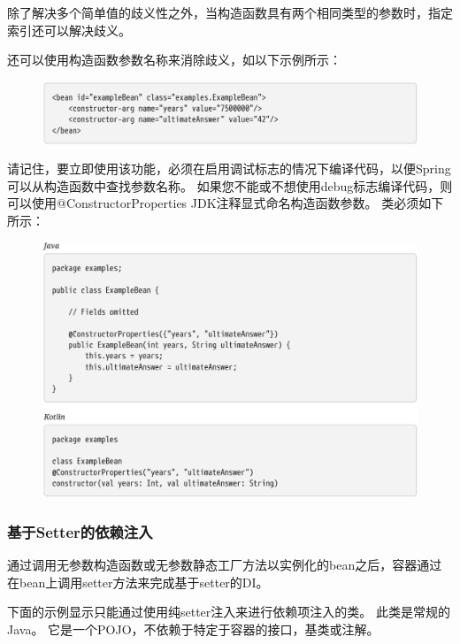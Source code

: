除了解决多个简单值的歧义性之外，当构造函数具有两个相同类型的参数时，指定索引还可以解决歧义。

还可以使用构造函数参数名称来消除歧义，如以下示例所示：

\begin{figure}[ht]
    \centering
    \includegraphics[width=1\linewidth]{./Figure/IMG_code_29.png}
\end{figure}

请记住，要立即使用该功能，必须在启用调试标志的情况下编译代码，以便Spring可以从构造函数中查找参数名称。 如果您不能或不想使用debug标志编译代码，则可以使用@ConstructorProperties JDK注释显式命名构造函数参数。 类必须如下所示：

\begin{figure}[ht]
    \centering
    \includegraphics[width=1\linewidth]{./Figure/IMG_code_30.png}
\end{figure}

\newpage
\subsubsection{基于Setter的依赖注入}
通过调用无参数构造函数或无参数静态工厂方法以实例化的bean之后，容器通过在bean上调用setter方法来完成基于setter的DI。

下面的示例显示只能通过使用纯setter注入来进行依赖项注入的类。 此类是常规的Java。 它是一个POJO，不依赖于特定于容器的接口，基类或注解。

